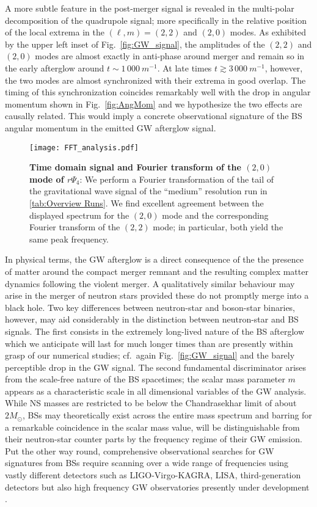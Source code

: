 \documentclass[11pt]{report}  %
\begin{document}
A more subtle feature in the post-merger signal is revealed in
the multi-polar decomposition of the quadrupole signal;
more specifically in the relative position of the local extrema
in the $(\ell,m)=(2,2)$ and $(2,0)$ modes. As exhibited by
the upper left inset of Fig.~\ref{fig:GW_signal}, the amplitudes
of the $(2,2)$ and $(2,0)$ modes are almost exactly
in anti-phase around merger and remain so in the early afterglow
around $t\sim 1\,000~m^{-1}$. At late times
$t\gtrsim 3\,000~m^{-1}$, however, the
two modes are almost synchronized with their extrema
in good overlap.
The timing of this synchronization coincides remarkably well
with the drop in angular momentum shown in Fig.~\ref{fig:AngMom}
and we hypothesize the two effects are causally related.
This would imply a concrete observational signature of the
BS angular momentum in the emitted GW afterglow signal.
\begin{figure}[t]
\begin{center}
{\texttt{[image: FFT\_analysis.pdf]}}
\caption{{\bf Time domain signal and
    Fourier transform of the $(2,0)$ mode
    of $r\Psi_4$}: We perform a Fourier
    transformation of the tail of the gravitational wave signal of the ``medium'' resolution run in \cref{tab:Overview Runs}.
    We find excellent agreement between the displayed
    spectrum for the $(2,0)$ mode and the corresponding Fourier transform of the $(2,2)$ mode; in particular, both yield the same peak frequency. 
    }
\label{fig:Fourier}
\end{center}
\end{figure}
 

In physical terms, the GW afterglow is a direct consequence
of the the presence of matter around the compact merger remnant
and the resulting complex matter dynamics following the violent
merger. A qualitatively similar behaviour may arise in the
merger of neutron stars provided these do not promptly merge
into a black hole. Two key differences between neutron-star
and boson-star binaries, however, may aid considerably in the
distinction between neutron-star and BS
signals. The first consists in the
extremely long-lived nature of the BS afterglow which we
anticipate will last for much longer times than are presently
within grasp of our numerical studies; cf.~again Fig.~\ref{fig:GW_signal} and the barely perceptible
drop in the GW signal. The second fundamental discriminator
arises from the scale-free nature of the BS spacetimes;
the scalar mass parameter $m$ appears as a characteristic
scale in all dimensional variables of the GW analysis.
While NS masses are restricted to be below the Chandrasekhar limit of about $2 M_{\odot}$, BSs may theoretically exist
across the entire mass spectrum and barring for a remarkable
coincidence in the scalar mass value, will be distinguishable
from their neutron-star counter parts by the frequency regime
of their GW emission. Put the other way round, comprehensive
observational searches for GW signatures from BSs require
scanning over a wide range of frequencies using vastly
different detectors such as LIGO-Virgo-KAGRA, LISA,
third-generation detectors but also high frequency GW observatories presently under development \cite{Aggarwal:2020olq,Badurina:2019hst}.
\end{document}
